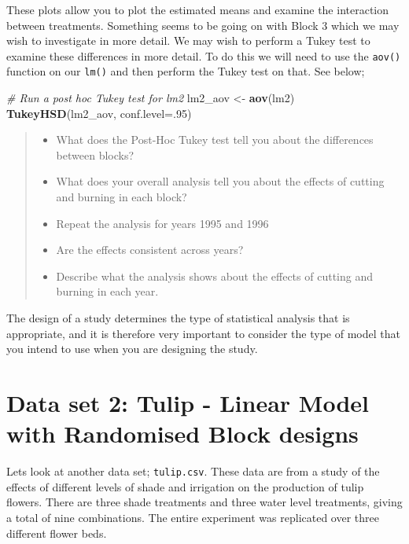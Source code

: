 \documentclass[
]{book}
\newenvironment{Shaded}{\begin{snugshade}}{\end{snugshade}}
\newcommand{\AttributeTok}[1]{\textcolor[rgb]{0.13,0.29,0.53}{#1}}
\newcommand{\CommentTok}[1]{\textcolor[rgb]{0.56,0.35,0.01}{\textit{#1}}}
\newcommand{\DecValTok}[1]{\textcolor[rgb]{0.00,0.00,0.81}{#1}}
\newcommand{\FunctionTok}[1]{\textcolor[rgb]{0.13,0.29,0.53}{\textbf{#1}}}
\newcommand{\NormalTok}[1]{#1}
\newcommand{\OtherTok}[1]{\textcolor[rgb]{0.56,0.35,0.01}{#1}}
\providecommand{\tightlist}{%
  \setlength{\itemsep}{0pt}\setlength{\parskip}{0pt}}
\begin{document}
These plots allow you to plot the estimated means and examine the interaction between treatments. Something seems to be going on with Block 3 which we may wish to investigate in more detail. We may wish to perform a Tukey test to examine these differences in more detail. To do this we will need to use the \texttt{aov()} function on our \texttt{lm()} and then perform the Tukey test on that. See below;

\begin{Shaded}
\begin{Highlighting}[]
\CommentTok{\# Run a post hoc Tukey test for lm2}
\NormalTok{lm2\_aov }\OtherTok{\textless{}{-}} \FunctionTok{aov}\NormalTok{(lm2)}
\FunctionTok{TukeyHSD}\NormalTok{(lm2\_aov, }\AttributeTok{conf.level=}\NormalTok{.}\DecValTok{95}\NormalTok{)}
\end{Highlighting}
\end{Shaded}

\begin{quote}
\begin{itemize}
\tightlist
\item
  What does the Post-Hoc Tukey test tell you about the differences between blocks?
\item
  What does your overall analysis tell you about the effects of cutting and burning in each block?
\item
  Repeat the analysis for years 1995 and 1996
\item
  Are the effects consistent across years?
\item
  Describe what the analysis shows about the effects of cutting and burning in each year.
\end{itemize}
\end{quote}

The design of a study determines the type of statistical analysis that is appropriate, and it is therefore very important to consider the type of model that you intend to use when you are designing the study.

\hypertarget{data-set-2-tulip---linear-model-with-randomised-block-designs}{%
\section{Data set 2: Tulip - Linear Model with Randomised Block designs}\label{data-set-2-tulip---linear-model-with-randomised-block-designs}}

Lets look at another data set; \texttt{tulip.csv}. These data are from a study of the effects of different levels of shade and irrigation on the production of tulip flowers. There are three shade treatments and three water level treatments, giving a total of nine combinations. The entire experiment was replicated over three different flower beds.
\end{document}

